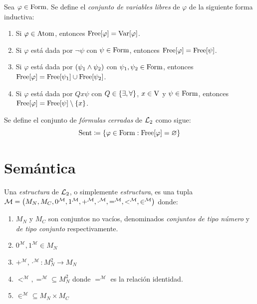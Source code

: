 \begin{definition}
	Sea $\varphi\in\FORMULAS$. Se define el \emph{conjunto de variables libres} de $\varphi$ de la siguiente forma inductiva:

	\begin{enumerate}
		\item Si $\varphi\in\ATOMICAS$, entonces $\LIBRESDE{\varphi} =\VARIABLESDE{\varphi}$.
		\item Si $\varphi$ está dada por $\neg\psi$ con $\psi\in\FORMULAS$, entonces $\LIBRESDE{\varphi} =\LIBRESDE{\psi}$.
		\item Si $\varphi$ está dada por $\pa*{\psi_{1}\land\psi_{2}}$ con $\psi_{1},\psi_{2}\in\FORMULAS$, entonces $\LIBRESDE{\varphi} =\LIBRESDE{\psi_{1}}\cup\LIBRESDE{\psi_{2}}$.
		\item Si $\varphi$ está dada por $Qx\psi$ con $Q\in\set*{\exists,\forall}$, $x\in\VARIABLES$ y $\psi\in\FORMULAS$, entonces $\LIBRESDE{\varphi} =\LIBRESDE{\psi}\setminus\set*{x}$.
	\end{enumerate}
\end{definition}

\begin{definition}
	Se define el conjunto de \emph{fórmulas cerradas} de $\ARITMETICA$ como sigue:
	\[
		\ENUNCIADOS\coloneqq\set*{\varphi\in\FORMULAS:\LIBRESDE{\varphi} =\varnothing}
	\]
\end{definition}

\section{Semántica}

\begin{definition}[Estructuras]
	Una \emph{estructura} de $\ARITMETICA$, o simplemente             \emph{estructura}, es una tupla $\mathcal{M} =\pa*{M_{N}, M_{C}, 0^{\mathcal{M}}, 1^{\mathcal{M}}, +^{\mathcal{M}},\cdot^{\mathcal{M}}, =^{\mathcal{M}}, <^{\mathcal{M}},\in^{\mathcal{M}}}$ donde:

	\begin{enumerate}
		\item $M_{N}$ y $M_{C}$ son conjuntos no vacíos, denominados \emph{conjuntos de tipo número} y \emph{de tipo conjunto} respectivamente.
		\item $0^{\mathcal{M}}, 1^{\mathcal{M}}\in M_{N}$
		\item $+^{\mathcal{M}},\cdot^{\mathcal{M}}: M_{N}^{2}\to M_{N}$
		\item $<^{\mathcal{M}}, =^{\mathcal{M}}\subseteq M_{N}^{2}$ donde $=^{\mathcal{M}}$ es la relación identidad.
		\item $\in^{\mathcal{M}}\subseteq M_{N}\times M_{C}$
	\end{enumerate}
\end{definition}

